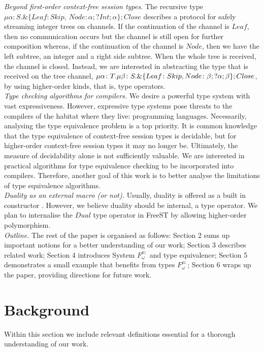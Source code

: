 \documentclass[sigplan]{acmart}
\begin{document}
\textit{Beyond first-order context-free session types.   }  
The recursive type $\mu\alpha\colon S.\&\{Leaf\colon Skip,\  Node\colon\alpha;?Int;\alpha\};Close$ describes a protocol for safely streaming integer trees on channels. If the continuation of the channel is $Leaf$, then no communication occurs but the channel is still open for further composition whereas, if the continuation of the channel is $Node$, then we have the left subtree, an integer and a right side subtree. When the whole tree is received, the channel is closed.
Instead, we are interested in abstracting the type that is received on the tree channel, $\mu\alpha\colon T.\mu\beta\colon S.\&\{Leaf\colon Skip,\\
Node\colon\beta; ?\alpha; \beta\};Close$, by using higher-order kinds, that is, type operators.\\

\textit{Type checking algorithms for compilers.  }
We desire a powerful type system with vast expressiveness. However, expressive type systems pose threats to the compilers of the habitat where they live: programming languages. Necessarily, analysing the type equivalence problem is a top priority. It is common knowledge that the type equivalence of context-free session types is decidable, but for higher-order context-free session types it may no longer be. Ultimately, the measure of decidability alone is not sufficiently valuable. We are interested in practical algorithms for type equivalence checking to be incorporated into compilers. Therefore, another goal of this work is to better analyse the limitations of type equivalence algorithms.\\

\textit{Duality as an external macro (or not).   }
Usually, duality is offered as a built in constructor \cite{DBLP:journals/corr/abs-2004-01322}. However, we believe duality should be internal, a type operator. We plan to internalise the $Dual$ type operator in FreeST by allowing higher-order polymorphism.\\

\textit{Outline. } 
The rest of the paper is organised as follows: Section 2 sums up important notions for a better understanding of our work; Section 3 describes related work; Section 4 introduces System $F^{\mu;}_\omega$ and type equivalence; Section 5 demonstrates a small example that benefits from types $F^{\mu;}_\omega$; Section 6 wraps up the paper, providing directions for future work.

\section{Background} \label{sec:background}
Within this section we include relevant definitions essential for a thorough understanding of our work. 
\end{document}
